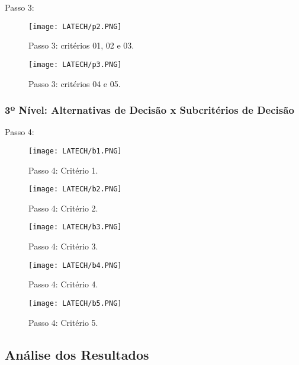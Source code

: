 \documentclass[onecolumn,11pt]{asme2ej}
\begin{document}
Passo 3:

\FloatBarrier
\begin{figure}[h]
    \centering
    \texttt{[image: LATECH/p2.PNG]}
     \caption{Passo 3: critérios 01, 02 e 03.}
    \label{fig:p_2}
\end{figure}
\FloatBarrier

\FloatBarrier
\begin{figure}[h]
    \centering
    \texttt{[image: LATECH/p3.PNG]}
    \caption{Passo 3: critérios 04 e 05.}
    \label{fig:p_3}
\end{figure}
\FloatBarrier

\subsubsection{3º Nível: Alternativas de Decisão x Subcritérios de Decisão}

Passo 4:

\FloatBarrier
\begin{figure}[h]
    \centering
    \texttt{[image: LATECH/b1.PNG]}
    \caption{Passo 4: Critério 1.}
    \label{fig:b_1}
\end{figure}
\FloatBarrier

\FloatBarrier
\begin{figure}[h]
    \centering
    \texttt{[image: LATECH/b2.PNG]}
    \caption{Passo 4: Critério 2.}
    \label{fig:b_2}
\end{figure}
\FloatBarrier

\FloatBarrier
\begin{figure}[h]
    \centering
    \texttt{[image: LATECH/b3.PNG]}
    \caption{Passo 4: Critério 3.}
    \label{fig:b_3}
\end{figure}
\FloatBarrier

\FloatBarrier
\begin{figure}[h]
    \centering
    \texttt{[image: LATECH/b4.PNG]}
    \caption{Passo 4: Critério 4.}
    \label{fig:b_4}
\end{figure}
\FloatBarrier

\FloatBarrier
\begin{figure}[h]
    \centering
    \texttt{[image: LATECH/b5.PNG]}
    \caption{Passo 4: Critério 5.}
    \label{fig:b_5}
\end{figure}
\FloatBarrier

\subsection{Análise dos Resultados}
\end{document}
